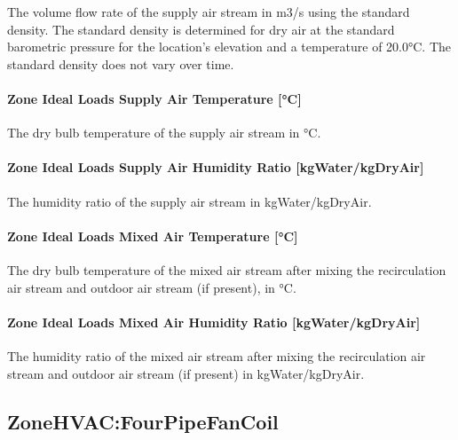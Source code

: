The volume flow rate of the supply air stream in m3/s using the standard density. The standard density is determined for dry air at the standard barometric pressure for the location's elevation and a temperature of 20.0\si{\degreeCelsius}. The standard density does not vary over time.

\paragraph{Zone Ideal Loads Supply Air Temperature {[}\si{\degreeCelsius}{]}}\label{zone-ideal-loads-supply-air-temperature-c}

The dry bulb temperature of the supply air stream in \si{\degreeCelsius}.


\paragraph{Zone Ideal Loads Supply Air Humidity Ratio {[}kgWater/kgDryAir{]}}\label{zone-ideal-loads-supply-air-humidity-ratio-kgWaterkgDryAir}

The humidity ratio of the supply air stream in kgWater/kgDryAir.


\paragraph{Zone Ideal Loads Mixed Air Temperature {[}\si{\degreeCelsius}{]}}\label{zone-ideal-loads-mixed-air-temperature-c}

The dry bulb temperature of the mixed air stream after mixing the recirculation air stream and outdoor air stream (if present), in \si{\degreeCelsius}.


\paragraph{Zone Ideal Loads Mixed Air Humidity Ratio {[}kgWater/kgDryAir{]}}\label{zone-ideal-loads-mixed-air-humidity-ratio-kgWaterkgDryAir}

The humidity ratio of the mixed air stream after mixing the recirculation air stream and outdoor air stream (if present) in kgWater/kgDryAir.


\subsection{ZoneHVAC:FourPipeFanCoil}\label{zonehvacfourpipefancoil}

